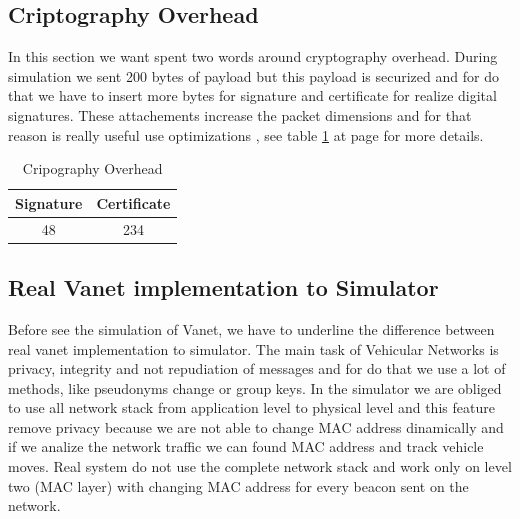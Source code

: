 \subsection{Criptography Overhead}\label{sec:CryptographyOverhead}
In this section we want spent two words around cryptography overhead. During simulation we sent 200 bytes of payload but this payload is securized and for do that we have to insert more bytes for signature and certificate for realize digital signatures. These attachements increase the packet dimensions and for that reason is really useful use optimizations \cite{calandriello}, see table \ref{tab:CryptographyOverhead} at page \pageref{tab:CryptographyOverhead} for more details.
\begin{table}[!ht]
	\centering
	\caption{Cripography Overhead}
	\begin{tabular}{|c|c|}
	\hline\hline 
	\textbf{Signature} & \textbf{Certificate}\\
	\hline
		48 & 234\\
	\hline
	\hline     %
 	\end{tabular} 
	\label{tab:CryptographyOverhead}
\end{table}
\subsection{Real Vanet implementation to Simulator}
Before see the simulation of Vanet, we have to underline the difference between real vanet implementation to simulator. The main task of Vehicular Networks is privacy, integrity and not repudiation of messages and for do that we use a lot of methods, like pseudonyms change or group keys. In the simulator we are obliged to use all network stack from application level to physical level and this feature remove privacy because we are not able to change MAC address dinamically and if we analize the network traffic we can found MAC address and track vehicle moves. Real system do not use the complete network stack and work only on level two (MAC layer) with changing MAC address for every beacon sent on the network.
